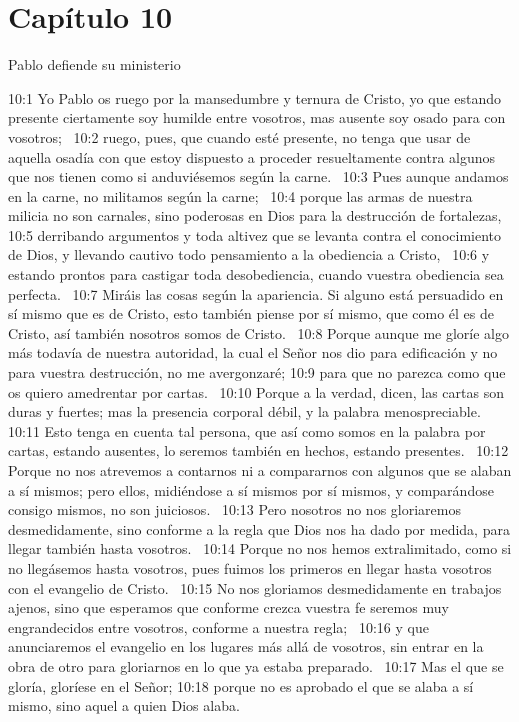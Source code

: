 \section*{Capítulo 10 }
Pablo defiende su ministerio  

10:1 Yo Pablo os ruego por la mansedumbre y ternura de Cristo, yo que estando presente ciertamente soy humilde entre vosotros, mas ausente soy osado para con vosotros;  
10:2 ruego, pues, que cuando esté presente, no tenga que usar de aquella osadía con que estoy dispuesto a proceder resueltamente contra algunos que nos tienen como si anduviésemos según la carne.  
10:3 Pues aunque andamos en la carne, no militamos según la carne;  
10:4 porque las armas de nuestra milicia no son carnales, sino poderosas en Dios para la destrucción de fortalezas,  
10:5 derribando argumentos y toda altivez que se levanta contra el conocimiento de Dios, y llevando cautivo todo pensamiento a la obediencia a Cristo,  
10:6 y estando prontos para castigar toda desobediencia, cuando vuestra obediencia sea perfecta.  
10:7 Miráis las cosas según la apariencia. Si alguno está persuadido en sí mismo que es de Cristo, esto también piense por sí mismo, que como él es de Cristo, así también nosotros somos de Cristo.  
10:8 Porque aunque me gloríe algo más todavía de nuestra autoridad, la cual el Señor nos dio para edificación y no para vuestra destrucción, no me avergonzaré; 
10:9 para que no parezca como que os quiero amedrentar por cartas.  
10:10 Porque a la verdad, dicen, las cartas son duras y fuertes; mas la presencia corporal débil, y la palabra menospreciable.  
10:11 Esto tenga en cuenta tal persona, que así como somos en la palabra por cartas, estando ausentes, lo seremos también en hechos, estando presentes.  
10:12 Porque no nos atrevemos a contarnos ni a compararnos con algunos que se alaban a sí mismos; pero ellos, midiéndose a sí mismos por sí mismos, y comparándose consigo mismos, no son juiciosos.  
10:13 Pero nosotros no nos gloriaremos desmedidamente, sino conforme a la regla que Dios nos ha dado por medida, para llegar también hasta vosotros.  
10:14 Porque no nos hemos extralimitado, como si no llegásemos hasta vosotros, pues fuimos los primeros en llegar hasta vosotros con el evangelio de Cristo.  
10:15 No nos gloriamos desmedidamente en trabajos ajenos, sino que esperamos que conforme crezca vuestra fe seremos muy engrandecidos entre vosotros, conforme a nuestra regla;  
10:16 y que anunciaremos el evangelio en los lugares más allá de vosotros, sin entrar en la obra de otro para gloriarnos en lo que ya estaba preparado.  
10:17 Mas el que se gloría, gloríese en el Señor; 
10:18 porque no es aprobado el que se alaba a sí mismo, sino aquel a quien Dios alaba. 
